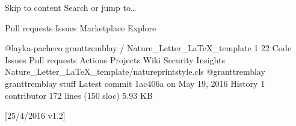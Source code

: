Skip to content
Search or jump to…

Pull requests
Issues
Marketplace
Explore
 
@layka-pacheco 
granttremblay
/
Nature_Letter_LaTeX_template
1
22
Code
Issues
Pull requests
Actions
Projects
Wiki
Security
Insights
Nature_Letter_LaTeX_template/natureprintstyle.cls
@granttremblay
granttremblay stuff
Latest commit 1ac406a on May 19, 2016
 History
 1 contributor
172 lines (150 sloc)  5.93 KB
  

[25/4/2016 v1.2]


\RequirePackage{times}
\RequirePackage{cite}
\RequirePackage{ifthen}
\RequirePackage[total={18.2cm,24.4cm},centering]{geometry}
\RequirePackage{scalefnt}
\RequirePackage{type1cm}
\RequirePackage{color}


